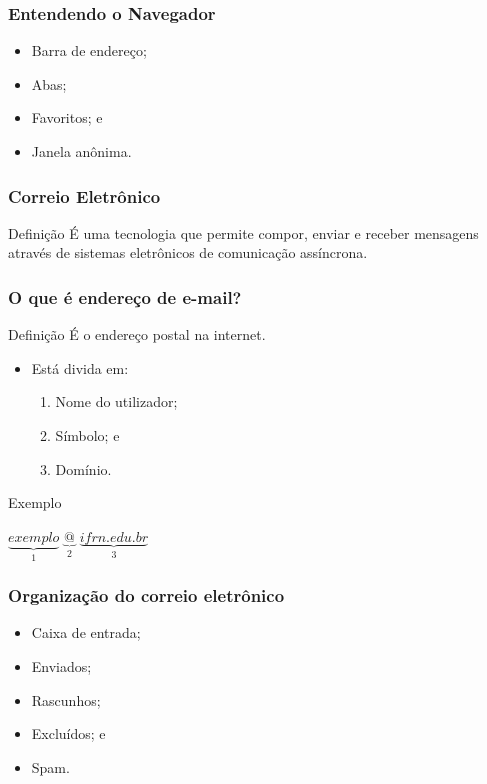 \documentclass[aspectratio=169]{beamer} %
\begin{document}
\begin{frame}
	\frametitle{Entendendo o Navegador}
	
	\begin{itemize}
		\item Barra de endereço;
		\item Abas;
		\item Favoritos; e
		\item Janela anônima.
	\end{itemize}
\end{frame}

\begin{frame}
	\frametitle{Correio Eletrônico}
	
	\begin{block}{Defini\c cão}
		É uma tecnologia que permite compor, enviar e receber mensagens através de sistemas eletrônicos de comunicação assíncrona.
	\end{block}
\end{frame}

\begin{frame}
	\frametitle{O que é endere\c co de e-mail?}
	
	\begin{block}{Defini\c cão}
		É o endere\c co postal na internet.
	\end{block} \vfill
	
	\begin{itemize}
		\item Está divida em: 
		\begin{enumerate}
			\item Nome do utilizador; 
			\item Símbolo;  e
			\item Domínio. 
		\end{enumerate}				
	\end{itemize} \vfill
	
	\begin{exampleblock}{Exemplo}
		\begin{center}
			$\underbrace{exemplo}_{1}$ $\underbrace{@}_{2}$ $\underbrace{ifrn.edu.br}_{3}$
		\end{center}
	\end{exampleblock}
\end{frame}

\begin{frame}
	\frametitle{Organiza\c cão do correio eletrônico}
	
	\begin{itemize}
		\item Caixa de entrada;
		\item Enviados;
		\item Rascunhos;
		\item Excluídos; e
		\item Spam.
	\end{itemize}
\end{frame}
\end{document}
